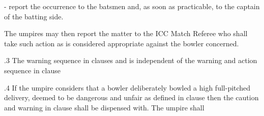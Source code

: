 \documentclass[12pt]{article}
\begin{document}
\vspace{\baselineskip}
\begin{adjustwidth}{0.5in}{0.0in}
{\fontsize{9pt}{10.8pt}\selectfont - report the occurrence to the batsmen and, as soon as practicable, to the captain of the batting side.\par}\par

\end{adjustwidth}


\vspace{\baselineskip}
\begin{adjustwidth}{0.5in}{0.57in}
{\fontsize{9pt}{10.8pt}\selectfont The umpires may then report the matter to the ICC Match Referee who shall take such action as is considered appropriate against the bowler concerned.\par}\par

\end{adjustwidth}


\vspace{\baselineskip}
\begin{adjustwidth}{0.5in}{0.14in}
{\fontsize{9pt}{10.8pt}.3 \tabto{0.49in} The warning sequence in clauses and is independent of the warning and action sequence in clause \par}\par

\end{adjustwidth}


\vspace{\baselineskip}

\vspace{\baselineskip}

\vspace{\baselineskip}

\vspace{\baselineskip}

\vspace{\baselineskip}
\begin{Center}
{\fontsize{8pt}{9.6pt}\par}
\end{Center}\par


\vspace{\baselineskip}

\vspace{\baselineskip}
\begin{adjustwidth}{0.5in}{0.25in}
{\fontsize{9pt}{10.8pt}.4 \tabto{0.49in} If the umpire considers that a bowler deliberately bowled a high full-pitched delivery, deemed to be dangerous and unfair as defined in clause then the caution and warning in clause shall be dispensed with. The umpire shall\par}\par

\end{adjustwidth}
\end{document}

